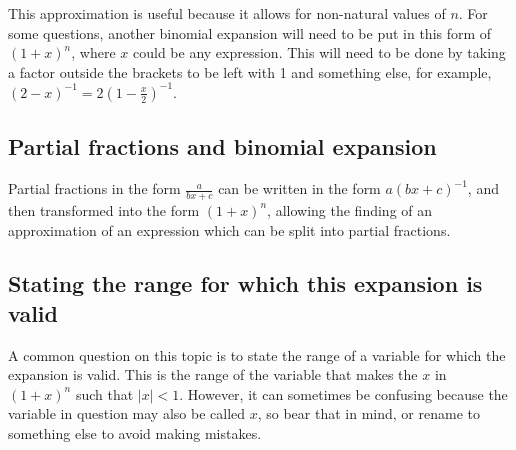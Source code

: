 This approximation is useful because it allows for non-natural values of $n$. For some questions, another binomial expansion will need to be put in this form of $(1+x)^n$, where $x$ could be any expression. This will need to be done by taking a factor outside the brackets to be left with 1 and something else, for example, $(2-x)^{-1} = 2\left(1-\frac{x}{2}\right)^{-1}$.

\subsection{Partial fractions and binomial expansion}
Partial fractions in the form $\frac{a}{bx+c}$ can be written in the form $a(bx+c)^{-1}$, and then transformed into the form $(1+x)^n$, allowing the finding of an approximation of an expression which can be split into partial fractions.

\subsection{Stating the range for which this expansion is valid}
A common question on this topic is to state the range of a variable for which the expansion is valid. This is the range of the variable that makes the $x$ in $(1+x)^n$ such that $|x|<1$. However, it can sometimes be confusing because the variable in question may also be called $x$, so bear that in mind, or rename to something else to avoid making mistakes.
